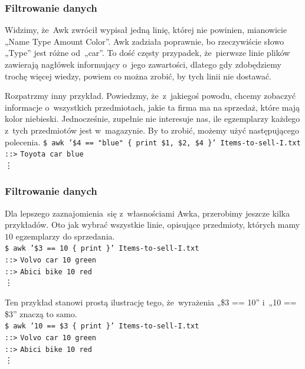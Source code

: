 \documentclass[10pt,t]{beamer}
\begin{document}
\begin{frame}
  \frametitle{Filtrowanie danych}


  Widzimy, że~Awk zwrócił wypisał jedną linię, której nie powinien,
  mianowicie „Name Type Amount Color”. Awk zadziała poprawnie, bo
  rzeczywiście słowo „Type” jest różne od~„car”. To dość częsty przypadek,
  że~pierwsze linie plików zawierają nagłówek informujący o~jego
  zawartości, dlatego gdy zdobędziemy trochę więcej wiedzy, powiem co można
  zrobić, by tych linii nie dostawać.

  Rozpatrzmy inny przykład. Powiedzmy, że~z~jakiegoś powodu, chcemy
  zobaczyć informacje o~wszystkich przedmiotach, jakie ta firma ma na
  sprzedaż, które mają kolor niebieski. Jednocześnie, zupełnie nie
  interesuje nas, ile egzemplarzy każdego z~tych przedmiotów jest
  w~magazynie. By to zrobić, możemy użyć następującego polecenia.
  \texttt{\$ awk '\$4 == "blue" \hspace{0.25em} \{ print \$1, \$2, \$4 \}'
    Items-to-sell-I.txt} \\
  \texttt{::>} \texttt{Toyota car blue} \\
  \hspace{3em} \vdots

\end{frame}





\begin{frame}
  \frametitle{Filtrowanie danych}


  Dla lepszego zaznajomienia~się z~własnościami Awka, przerobimy
  jeszcze kilka przykładów. Oto jak wybrać wszystkie linie, opisujące
  przedmioty, których mamy $10$ egzemplarzy do sprzedania. \\
  \texttt{\$ awk '\$3 == 10  \{ print \}'
    Items-to-sell-I.txt} \\
  \texttt{::>} \texttt{Volvo car 10 green} \\
  \texttt{::>} \texttt{Abici bike 10 red} \\
  \hspace{3em} \vdots

  Ten przykład stanowi prostą ilustrację tego, że~wyrażenia „\$3 == 10”
  i~„10 == \$3” znaczą to samo. \\
  \texttt{\$ awk '10 == \$3 \{ print \}' Items-to-sell-I.txt} \\
  \texttt{::>} \texttt{Volvo car 10 green} \\
  \texttt{::>} \texttt{Abici bike 10 red} \\
  \hspace{3em} \vdots

\end{frame}
\end{document}
